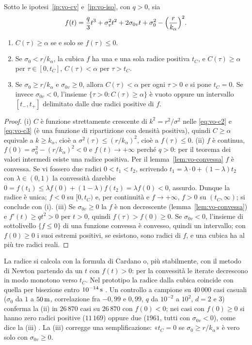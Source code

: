 \begin{proposizione}\label{prop:vo-tc}
Sotto le ipotesi~\ref{ip:vo-cv} e~\ref{ip:vo-iso}, con $q>0$, sia
\[f(t)=\frac q3t^3+\sigma_v^2t^2+2\sigma_{0v}t+\sigma_0^2-\Bigl(\frac r{k_\alpha}\Bigr)^2 .\]
\begin{enumerate}[label=(\roman*)]
\item $C(\tau)\ge\alpha$ se e solo se $f(\tau)\le0$.
\item Se $\sigma_0<r/k_\alpha$, la cubica $f$ ha una e una sola radice positiva $t_C$, e $C(\tau)\ge\alpha$ per $\tau\in[0,t_C]$, $C(\tau)<\alpha$ per $\tau>t_C$.
\item Se $\sigma_0\ge r/k_\alpha$ e $\sigma_{0v}\ge0$, allora $C(\tau)<\alpha$ per ogni $\tau>0$ e si pone $t_C=0$. Se invece $\sigma_{0v}<0$, l'insieme $\{\tau>0:C(\tau)\ge\alpha\}$ è vuoto oppure un intervallo $[t_-,t_+]$ delimitato dalle due radici positive di $f$.
\end{enumerate}
\end{proposizione}
\begin{proof}
(i) $C$ è funzione strettamente crescente di $k^2=r^2/\sigma^2$ nelle \eqref{eq:vo-c2} e \eqref{eq:vo-c3} (è una funzione di ripartizione con densità positiva), quindi $C\ge\alpha$ equivale a $k\ge k_\alpha$, cioè a $\sigma^2(\tau)\le(r/k_\alpha)^2$, cioè a $f(\tau)\le0$.
(ii) $f$ è continua, $f(0)=\sigma_0^2-(r/k_\alpha)^2<0$ e $f(t)\to+\infty$ perché $q>0$: per il teorema dei valori intermedi esiste una radice positiva. Per il lemma~\ref{lem:vo-convessa} $f$ è convessa. Se vi fossero due radici $0<t_1<t_2$, scrivendo $t_1=\lambda\cdot0+(1-\lambda)t_2$ con $\lambda\in(0,1)$ la convessità darebbe $0=f(t_1)\le\lambda f(0)+(1-\lambda)f(t_2)=\lambda f(0)<0$, assurdo. Dunque la radice è unica; $f<0$ su $[0,t_C)$ e, per continuità e $f\to+\infty$, $f>0$ su $(t_C,\infty)$; si conclude con (i).
(iii) Se $\sigma_{0v}\ge0$ la $f$ è non decrescente (lemma~\ref{lem:vo-convessa}) e $f'(t)\ge qt^2>0$ per $t>0$, quindi $f(\tau)>f(0)\ge0$. Se $\sigma_{0v}<0$, l'insieme di sottolivello $\{f\le0\}$ di una funzione convessa è convesso, quindi un intervallo; con $f(0)\ge0$ i suoi estremi positivi, se esistono, sono radici di $f$, e una cubica ha al più tre radici reali.
\end{proof}

La radice si calcola con la formula di Cardano o, più stabilmente, con il metodo di Newton partendo da un $t$ con $f(t)>0$: per la convessità le iterate decrescono in modo monotono verso $t_C$. Nel prototipo la radice dalla cubica coincide con quella per bisezione entro $10^{-14}\,\mathrm{s}$ . Un controllo a campione su $40\,000$ casi casuali ($\sigma_0$ da $1$ a $50\,\mathrm{m}$, correlazione fra $-0{,}99$ e $0{,}99$, $q$ da $10^{-2}$ a $10^2$, $d=2$ e $3$) conferma la (ii) in $26\,870$ casi su $26\,870$ con $f(0)<0$; nei casi con $f(0)\ge0$ si hanno zero radici positive ($11\,169$) oppure due ($1961$, tutti con $\sigma_{0v}<0$), come dice la (iii) . La (iii) corregge una semplificazione: «$t_C=0$ se $\sigma_0\ge r/k_\alpha$» è vero solo con $\sigma_{0v}\ge0$.

